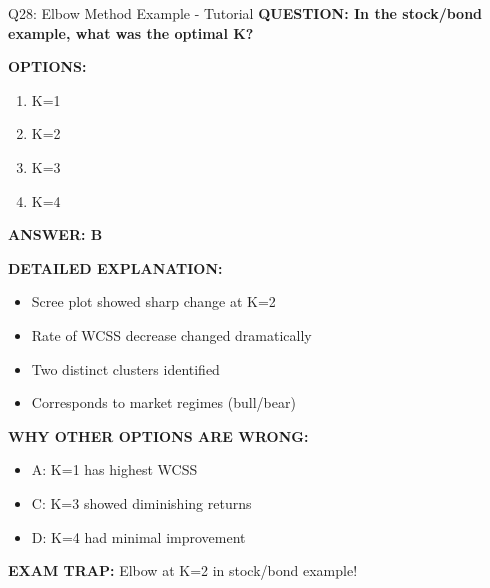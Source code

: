 \documentclass[8pt]{beamer}
\begin{document}
	\begin{frame}{Q28: Elbow Method Example - Tutorial}
		\fontsize{6.5}{7.5}\selectfont
		\textbf{QUESTION: In the stock/bond example, what was the optimal K?}
		
		\vspace{0.1cm}
		\textbf{OPTIONS:}
		\begin{enumerate}
			\item K=1
			\item K=2
			\item K=3
			\item K=4
		\end{enumerate}
		
		\vspace{0.1cm}
		\textcolor{myblue}{\textbf{ANSWER: B}}
		
		\vspace{0.1cm}
		\textbf{DETAILED EXPLANATION:}
		\begin{itemize}
			\item Scree plot showed sharp change at K=2
			\item Rate of WCSS decrease changed dramatically
			\item Two distinct clusters identified
			\item Corresponds to market regimes (bull/bear)
		\end{itemize}
		
		\vspace{0.1cm}
		\textcolor{myred}{\textbf{WHY OTHER OPTIONS ARE WRONG:}}
		\begin{itemize}
			\item \textcolor{myred}{A:} K=1 has highest WCSS
			\item \textcolor{myred}{C:} K=3 showed diminishing returns
			\item \textcolor{myred}{D:} K=4 had minimal improvement
		\end{itemize}
		
		\textcolor{myred}{\textbf{EXAM TRAP:}} Elbow at K=2 in stock/bond example!
	\end{frame}
	
\end{document}
